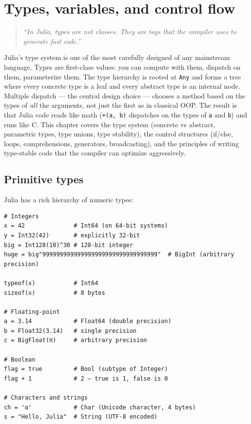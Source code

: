 \chapter{Types, variables, and control flow}
\label{ch:types-control}

\begin{quote}
\emph{``In Julia, types are not classes. They are tags that the compiler uses to generate fast code.''}
\end{quote}

Julia's type system is one of the most carefully designed of any mainstream language. Types are first-class values: you can compute with them, dispatch on them, parameterize them. The type hierarchy is rooted at \texttt{Any} and forms a tree where every concrete type is a leaf and every abstract type is an internal node. Multiple dispatch --- the central design choice --- chooses a method based on the types of \emph{all} the arguments, not just the first as in classical OOP. The result is that Julia code reads like math (\texttt{+(a, b)} dispatches on the types of \texttt{a} and \texttt{b}) and runs like C. This chapter covers the type system (concrete vs abstract, parametric types, type unions, type stability), the control structures (if/else, loops, comprehensions, generators, broadcasting), and the principles of writing type-stable code that the compiler can optimize aggressively.

\section{Primitive types}

Julia has a rich hierarchy of numeric types:

\begin{verbatim}
# Integers
x = 42              # Int64 (on 64-bit systems)
y = Int32(42)       # explicitly 32-bit
big = Int128(10)^30 # 128-bit integer
huge = big"999999999999999999999999999999999"  # BigInt (arbitrary precision)

typeof(x)           # Int64
sizeof(x)           # 8 bytes

# Floating-point
a = 3.14            # Float64 (double precision)
b = Float32(3.14)   # single precision
c = BigFloat(π)     # arbitrary precision

# Boolean
flag = true         # Bool (subtype of Integer)
flag + 1            # 2 — true is 1, false is 0

# Characters and strings
ch = 'α'            # Char (Unicode character, 4 bytes)
s = "Hello, Julia"  # String (UTF-8 encoded)
\end{verbatim}

